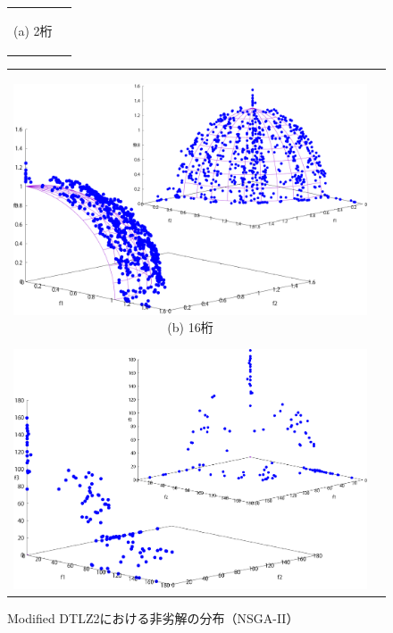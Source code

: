 \documentclass[../main/main]{subfiles}
\begin{document}
\begin{figure}[htbp]
\begin{tabular}{cc}
\begin{minipage}{0.32\hsize}
\begin{center}
{\footnotesize (a) 2桁}
\end{center}
\end{minipage}
\end{tabular}
\end{figure}

\begin{figure}[!h]
\begin{tabular}{cc}
\begin{minipage}{0.32\hsize}
\includegraphics[width=1\linewidth]{../figures/NSGA-II/modDTLZ2_digi16_double.pdf}
\centering
{\footnotesize (b) 16桁}
\caption{Modified DTLZ2における非劣解の分布（NSGA-II）}
\label{fig:dist_mod2_nsgaii}
\end{minipage}
\begin{minipage}{0.32\hsize}
\includegraphics[width=1\linewidth]{../figures/NSGA-II/modDTLZ3_digi16_double.pdf}

\end{minipage}
\end{tabular}
\end{figure}
\end{document}
